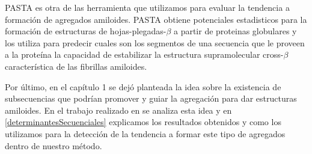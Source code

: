 PASTA es otra de las herramienta que utilizamos para evaluar la tendencia a formación de agregados amiloides. 
PASTA obtiene potenciales estadisticos para la formación de estructuras de hojas-plegadas-$\beta$ a partir de proteinas globulares y los utiliza para
predecir cuales son los segmentos de una secuencia que le proveen a la proteína la capacidad de estabilizar la estructura supramolecular cross-$\beta$ característica de las fibrillas amiloides.

Por último, en el capítulo 1 se dejó planteada la idea sobre la existencia de subsecuencias que podrían promover y guiar la agregación para dar estructuras amiloides.
En el trabajo realizado en \cite{de2004sequence} se analiza esta idea y en \ref{determinantesSecuenciales} explicamos los resultados obtenidos y como los utilizamos para la detección 
de la tendencia a formar este tipo de agregados dentro de nuestro método.





























